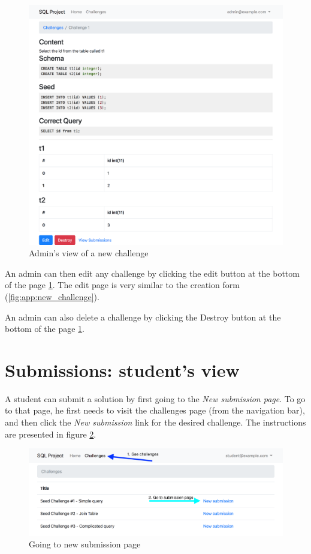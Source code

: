 \begin{figure}[ht]
    \centering
    \includegraphics[width=\textwidth/4*3]{Appendices/adminchallenge.png}
    \caption{Admin's view of a new challenge}
    \label{fig:app:challengeadmin}
\end{figure}

An admin can then edit any challenge by clicking the edit button at the bottom of the page \ref{fig:app:challengeadmin}. The edit page is very similar to the creation form (\ref{fig:app:new_challenge}).

An admin can also delete a challenge by clicking the Destroy button at the bottom of the page \ref{fig:app:challengeadmin}.

\section{Submissions: student's view}

A student can submit a solution by first going to the \textit{New submission page}. To go to that page, he first needs to visit the challenges page (from the navigation bar), and then click the \textit{New submission} link for the desired challenge. The instructions are presented in figure \ref{fig:app:new_submission}.

\begin{figure}[ht]
    \centering
    \includegraphics[width=\textwidth/4*3]{Appendices/challengeinde.png}
    \caption{Going to new submission page}
    \label{fig:app:new_submission}
\end{figure}

